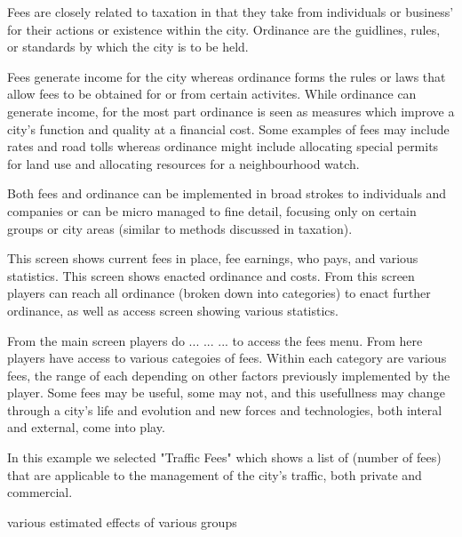 Fees are closely related to taxation in that they take from individuals or business' for their actions or existence within the city. Ordinance are the guidlines, rules, or standards by which the city is to be held.

Fees generate income for the city whereas ordinance forms the rules or laws that allow fees to be obtained for or from certain activites. While ordinance can generate income, for the most part ordinance is seen as measures which improve a city's function and quality at a financial cost. Some examples of fees may include rates and road tolls whereas ordinance might include allocating special permits for land use and allocating resources for a neighbourhood watch.

Both fees and ordinance can be implemented in broad strokes to individuals and companies or can be micro managed to fine detail, focusing only on certain groups or city areas (similar to methods discussed in taxation).


This screen shows current fees in place, fee earnings, who pays, and various statistics.
This screen shows enacted ordinance and costs. From this screen players can reach all ordinance (broken down into categories) to enact further ordinance, as well as access screen showing various statistics. 



From the main screen players do ... ... ... to access the fees menu. From here players have access to various categoies of fees. Within each category are various fees, the range of each depending on other factors previously implemented by the player. Some fees may be useful, some may not, and this usefullness may change through a city's life and evolution and new forces and technologies, both interal and external, come into play.


In this example we selected "Traffic Fees" which shows a list of (number of fees) that are applicable to the management of the city's traffic, both private and commercial.
 

various estimated effects of various groups




